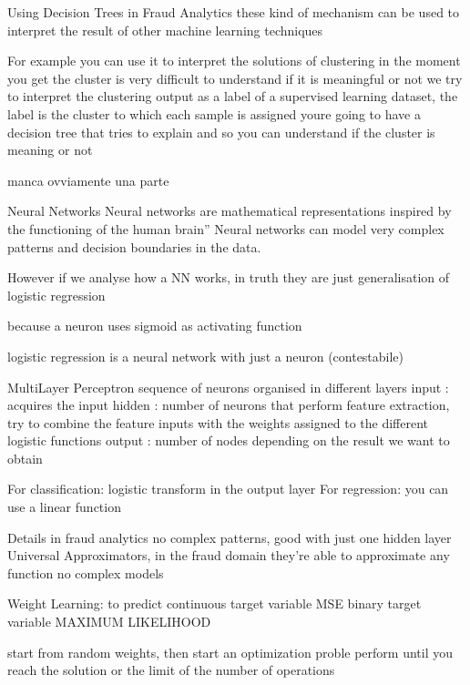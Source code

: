             Using Decision Trees in Fraud Analytics 
                these kind of mechanism can be used to interpret the result of other machine learning techniques

                For example you can use it to interpret the solutions of clustering
                    in the moment you get the cluster is very difficult to understand if it is meaningful or not 
                    we try to interpret the clustering output as a label of a supervised learning dataset, the label is the cluster to which each sample is assigned 
                    youre going to have a decision tree that tries to explain 
                    and so you can understand if the cluster is meaning or not 

                manca ovviamente una parte 
        
    Neural Networks
        Neural networks are mathematical representations
        inspired by the functioning of the human brain”
        Neural networks can model very complex patterns and
        decision boundaries in the data.

        However if we analyse how a NN works, in truth they are just generalisation of logistic regression 

        because a neuron uses sigmoid as activating function 

        logistic regression is a neural network with just a neuron (contestabile)


        MultiLayer Perceptron 
            sequence of neurons organised in different layers 
                input : acquires the input
                hidden : number of neurons that perform feature extraction, try to combine the feature inputs with the weights assigned to the different logistic functions 
                output : number of nodes depending on the result we want to obtain
            
            For classification: logistic transform in the output layer 
            For regression: you can use a linear function 

        Details 
            in fraud analytics no complex patterns, good with just one hidden layer 
            Universal Approximators, in the fraud domain they're able to approximate any function 
            no complex models 

        Weight Learning:
            to predict continuous target variable MSE 
            binary target variable MAXIMUM LIKELIHOOD 

            start from random weights, then start an optimization proble 
            perform until you reach the solution or the limit of the number of operations 

